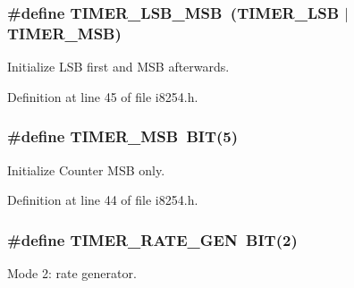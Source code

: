 \hypertarget{group__i8254_ga8c0f1933323274c765e23837e4fbc8c7}{}
\subsubsection[{T\+I\+M\+E\+R\+\_\+\+L\+S\+B\+\_\+\+M\+S\+B}]{\setlength{\rightskip}{0pt plus 5cm}\#define T\+I\+M\+E\+R\+\_\+\+L\+S\+B\+\_\+\+M\+S\+B~({\bf T\+I\+M\+E\+R\+\_\+\+L\+S\+B} $\vert$ {\bf T\+I\+M\+E\+R\+\_\+\+M\+S\+B})}\label{group__i8254_ga8c0f1933323274c765e23837e4fbc8c7}


Initialize L\+S\+B first and M\+S\+B afterwards. 



Definition at line 45 of file i8254.\+h.

\hypertarget{group__i8254_ga2a8a6d363c612d756cd8d78480f7cd04}{}
\subsubsection[{T\+I\+M\+E\+R\+\_\+\+M\+S\+B}]{\setlength{\rightskip}{0pt plus 5cm}\#define T\+I\+M\+E\+R\+\_\+\+M\+S\+B~{\bf B\+I\+T}(5)}\label{group__i8254_ga2a8a6d363c612d756cd8d78480f7cd04}


Initialize Counter M\+S\+B only. 



Definition at line 44 of file i8254.\+h.

\hypertarget{group__i8254_ga5d4449e0fa1cf4a4d107a48a04a1265f}{}
\subsubsection[{T\+I\+M\+E\+R\+\_\+\+R\+A\+T\+E\+\_\+\+G\+E\+N}]{\setlength{\rightskip}{0pt plus 5cm}\#define T\+I\+M\+E\+R\+\_\+\+R\+A\+T\+E\+\_\+\+G\+E\+N~{\bf B\+I\+T}(2)}\label{group__i8254_ga5d4449e0fa1cf4a4d107a48a04a1265f}


Mode 2\+: rate generator. 



